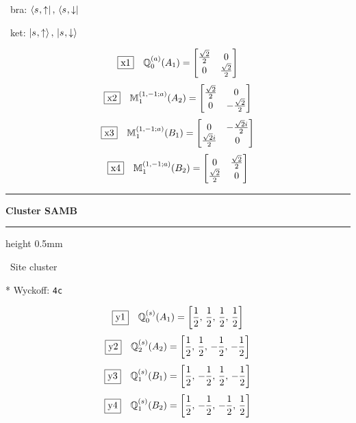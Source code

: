 \documentclass[fleqn,10pt,landscape]{jsarticle}
\begin{document}
\vspace{5mm}

\noindent\textbullet\, bra: $\bra{s_{},\uparrow},\, \bra{s_{},\downarrow}$

\noindent\textbullet\, ket: $\ket{s_{},\uparrow},\, \ket{s_{},\downarrow}$

\begin{dmath*}
\fbox{x1}\quad \mathbb{Q}_{0}^{(a)}(A_{1})=\begin{bmatrix} \frac{\sqrt{2}}{2} & 0 \\ 0 & \frac{\sqrt{2}}{2} \end{bmatrix}
\end{dmath*}
\begin{dmath*}
\fbox{x2}\quad \mathbb{M}_{1}^{(1,-1;a)}(A_{2})=\begin{bmatrix} \frac{\sqrt{2}}{2} & 0 \\ 0 & - \frac{\sqrt{2}}{2} \end{bmatrix}
\end{dmath*}
\begin{dmath*}
\fbox{x3}\quad \mathbb{M}_{1}^{(1,-1;a)}(B_{1})=\begin{bmatrix} 0 & - \frac{\sqrt{2} i}{2} \\ \frac{\sqrt{2} i}{2} & 0 \end{bmatrix}
\end{dmath*}
\begin{dmath*}
\fbox{x4}\quad \mathbb{M}_{1}^{(1,-1;a)}(B_{2})=\begin{bmatrix} 0 & \frac{\sqrt{2}}{2} \\ \frac{\sqrt{2}}{2} & 0 \end{bmatrix}
\end{dmath*}
\vspace{5mm}
\noindent \rule[0.5mm]{5mm}{0.5mm}\hspace{3mm}\textbf{Cluster SAMB}\hspace{3mm}\leaders\hrule height 0.5mm\hfill\kern0pt
\vspace{3mm}

\noindent\textbullet\, Site cluster

\vspace{5mm}

\noindent ** Wyckoff: \texttt{4c}

\begin{dmath*}
\fbox{y1}\quad \mathbb{Q}_{0}^{(s)}(A_{1})=\left[ \frac{1}{2},\, \frac{1}{2},\, \frac{1}{2},\, \frac{1}{2} \right]
\end{dmath*}
\begin{dmath*}
\fbox{y2}\quad \mathbb{Q}_{2}^{(s)}(A_{2})=\left[ \frac{1}{2},\, \frac{1}{2},\, - \frac{1}{2},\, - \frac{1}{2} \right]
\end{dmath*}
\begin{dmath*}
\fbox{y3}\quad \mathbb{Q}_{1}^{(s)}(B_{1})=\left[ \frac{1}{2},\, - \frac{1}{2},\, \frac{1}{2},\, - \frac{1}{2} \right]
\end{dmath*}
\begin{dmath*}
\fbox{y4}\quad \mathbb{Q}_{1}^{(s)}(B_{2})=\left[ \frac{1}{2},\, - \frac{1}{2},\, - \frac{1}{2},\, \frac{1}{2} \right]
\end{dmath*}
\vspace{5mm}
\end{document}
